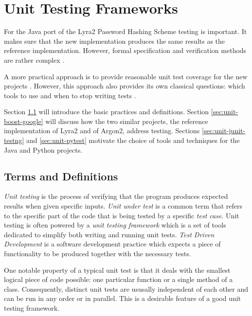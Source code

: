 \chapter{Unit Testing Frameworks}
\label{chapter:unit-testing-framework}

For the Java port of the Lyra2 Password Hashing Scheme testing is important. It makes sure that the new implementation produces the same results as the reference implementation. However, formal specification and verification methods are rather complex \cite{lamsweerde:2000:formal-specification, mueller:1994:formal-specification}.

A more practical approach is to provide reasonable unit test coverage for the new projects \cite{williams:2010:unit-tests-rock}. However, this approach also provides its own classical questions: which tools to use \cite{daka:2014:unit-testing-tools} and when to stop writing tests \cite{elberzhager:2012:reducing-effort}.

Section \ref{sec:unit-terms-and-definitions} will introduce the basic practices and definitions. Section \ref{sec:unit-boost-google} will discuss how the two similar projects, the reference implementation of Lyra2 and of Argon2, address testing. Sections \ref{sec:unit-junit-testng} and \ref{sec:unit-pytest} motivate the choice of tools and techniques for the Java and Python projects.

\section{Terms and Definitions}
\label{sec:unit-terms-and-definitions}

\emph{Unit testing} is the process of verifying that the program produces expected results when given specific inputs. \emph{Unit under test} is a common term that refers to the specific part of the code that is being tested by a specific \emph{test case}. Unit testing is often powered by a \emph{unit testing framework} which is a set of tools dedicated to simplify both writing and running unit tests. \emph{Test Driven Development} is a software development practice which expects a piece of functionality to be produced together with the necessary tests.

One notable property of a typical unit test is that it deals with the smallest logical piece of code possible: one particular function or a single method of a class. Consequently, distinct unit tests are ususally independent of each other and can be run in any order or in parallel. This is a desirable feature of a good unit testing framework.

